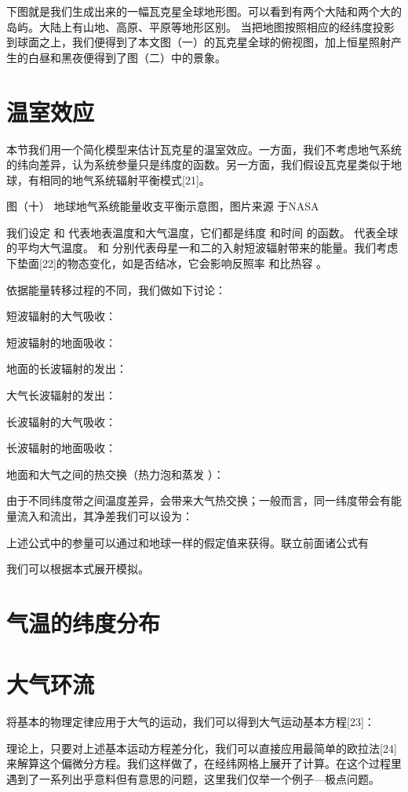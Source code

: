 \documentclass[a4paper,10.5pt]{book}
\begin{document}
下图就是我们生成出来的一幅瓦克星全球地形图。可以看到有两个大陆和两个大的岛屿。大陆上有山地、高原、平原等地形区别。
当把地图按照相应的经纬度投影到球面之上，我们便得到了本文图（一）的瓦克星全球的俯视图，加上恒星照射产生的白昼和黑夜便得到了图（二）中的景象。

\section{温室效应}

本节我们用一个简化模型来估计瓦克星的温室效应。一方面，我们不考虑地气系统的纬向差异，认为系统参量只是纬度的函数。另一方面，我们假设瓦克星类似于地球，有相同的地气系统辐射平衡模式[21]。


图（十）
地球地气系统能量收支平衡示意图，图片来源 于NASA

我们设定  和  代表地表温度和大气温度，它们都是纬度  和时间  的函数。   代表全球的平均大气温度。 和   分别代表母星一和二的入射短波辐射带来的能量。我们考虑下垫面[22]的物态变化，如是否结冰，它会影响反照率  和比热容  。

依据能量转移过程的不同，我们做如下讨论：

短波辐射的大气吸收：

短波辐射的地面吸收：

地面的长波辐射的发出：

大气长波辐射的发出：

长波辐射的大气吸收：

长波辐射的地面吸收：

地面和大气之间的热交换（热力泡和蒸发 ）：

由于不同纬度带之间温度差异，会带来大气热交换；一般而言，同一纬度带会有能量流入和流出，其净差我们可以设为：

上述公式中的参量可以通过和地球一样的假定值来获得。联立前面诸公式有

我们可以根据本式展开模拟。


\section{气温的纬度分布}

\section{大气环流}

将基本的物理定律应用于大气的运动，我们可以得到大气运动基本方程[23]：



理论上，只要对上述基本运动方程差分化，我们可以直接应用最简单的欧拉法[24]来解算这个偏微分方程。我们这样做了，在经纬网格上展开了计算。在这个过程里遇到了一系列出乎意料但有意思的问题，这里我们仅举一个例子—极点问题。
\end{document}
